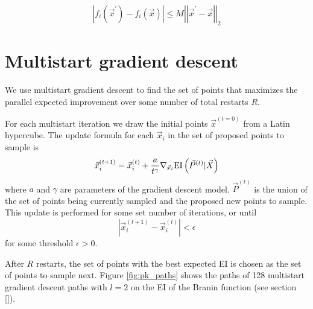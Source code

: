 \documentclass[phd,tocprelim]{cornell}
\begin{document}
\begin{equation}
    \left|f_{i}(\vec{x}^{\prime}) - f_{i}(\vec{x})\right| \leq M \left| \left| \vec{x}^{\prime} - \vec{x}\right|\right|_{2}
\end{equation}

\section{Multistart gradient descent}
\label{sec:multistart}

We use multistart gradient descent to find the set of points that maximizes the parallel expected improvement over some number of total restarts $R$.

For each multistart iteration we draw the initial points $\vec{x}^{(t=0)}$ from a Latin hypercube. The update formula for each $\vec{x}_{i}$ in the set of proposed points to sample is
\begin{equation}
    \vec{x}_{i}^{(t+1)} = \vec{x}_{i}^{(t)} + \frac{a}{t^{\gamma}} \nabla_{\vec{x}_{i}} {\rm EI}\left(\vec{P}^{(t)} | \vec{X}\right)
\end{equation}
where $a$ and $\gamma$ are parameters of the gradient descent model. $\vec{P}^{(t)}$ is the union of the set of points being currently sampled and the proposed new points to sample. This update is performed for some set number of iterations, or until
\begin{equation}
    |\vec{x}_{i}^{(t+1)} - \vec{x}_{i}^{(t)}| < \epsilon
\end{equation}
for some threshold $\epsilon > 0$.

After $R$ restarts, the set of points with the best expected EI is chosen as the set of points to sample next. Figure \ref{fig:pk_paths} shows the paths of 128 multistart gradient descent paths with $l = 2$ on the EI of the Branin function \cite{branin} (see section \ref{}).
\end{document}
